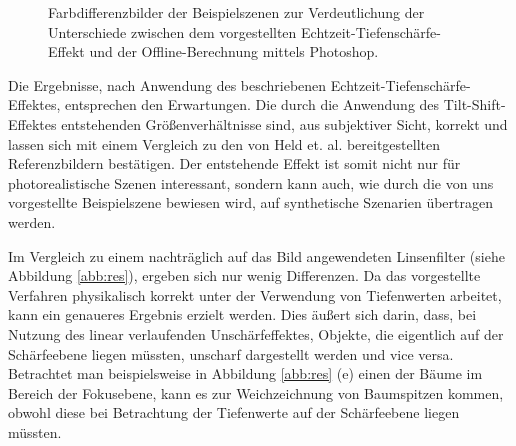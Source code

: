 \documentclass{acmsiggraph}                     %
\begin{document}
\begin{figure}[htb]
	\centering
	\qquad
\caption{Farbdifferenzbilder der Beispielszenen zur Verdeutlichung der Unterschiede zwischen dem vorgestellten Echtzeit-Tiefenschärfe-Effekt und der Offline-Berechnung mittels Photoshop.}
	\label{abb:diff}
\end{figure}

Die Ergebnisse, nach Anwendung des beschriebenen Echtzeit-Tiefenschärfe-Effektes, entsprechen den Erwartungen. Die durch die Anwendung des Tilt-Shift-Effektes entstehenden Größenverhältnisse sind, aus subjektiver Sicht, korrekt und lassen sich mit einem Vergleich zu den von Held et. al. bereitgestellten Referenzbildern bestätigen. Der entstehende Effekt ist somit nicht nur für photorealistische Szenen interessant, sondern kann auch, wie durch die von uns vorgestellte Beispielszene bewiesen wird, auf synthetische Szenarien übertragen werden.

Im Vergleich zu einem nachträglich auf das Bild angewendeten Linsenfilter (siehe Abbildung \ref{abb:res}), ergeben sich nur wenig Differenzen. Da das vorgestellte Verfahren physikalisch korrekt unter der Verwendung von Tiefenwerten arbeitet, kann ein genaueres Ergebnis erzielt werden. Dies äußert sich darin, dass, bei Nutzung des linear verlaufenden Unschärfeffektes, Objekte, die eigentlich auf der Schärfeebene liegen müssten, unscharf dargestellt werden und vice versa. Betrachtet man beispielsweise in Abbildung \ref{abb:res} (e) einen der Bäume im Bereich der Fokusebene, kann es zur Weichzeichnung von Baumspitzen kommen, obwohl diese bei Betrachtung der Tiefenwerte auf der Schärfeebene liegen müssten.
\end{document}
